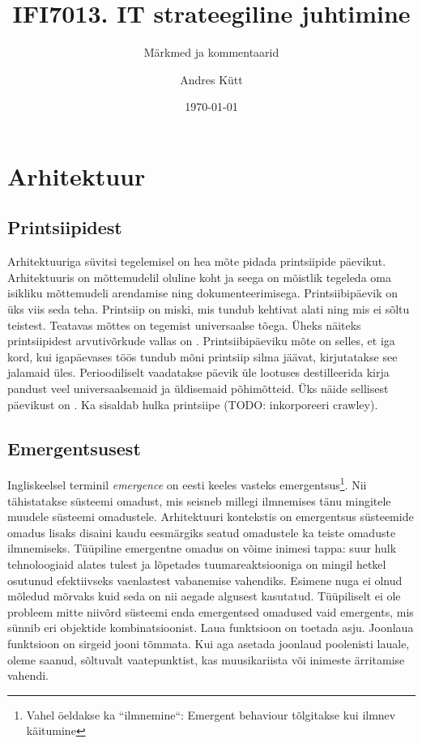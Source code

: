 \documentclass{article}
\title{IFI7013. IT strateegiline juhtimine}
\subtitle{Märkmed ja kommentaarid}
\date{\today}
\author{Andres Kütt}
\begin{document}
\maketitle
\clearpage
\setcounter{tocdepth}{2}
\tableofcontents
\clearpage


\section{Arhitektuur}
\subsection{Printsiipidest}
Arhitektuuriga süvitsi tegelemisel on hea mõte pidada printsiipide päevikut. Arhitektuuris on mõttemudelil oluline koht ja seega on mõistlik tegeleda oma isikliku mõttemudeli arendamise ning dokumenteerimisega. Printsiibipäevik on üks viis seda teha. Printsiip on miski, mis tundub kehtivat alati ning mis ei sõltu teistest. Teatavas mõttes on tegemist universaalse tõega. Üheks näiteks printsiipidest arvutivõrkude vallas on \cite{callon1996rfc}. Printsiibipäeviku mõte on selles, et iga kord, kui igapäevases töös tundub mõni printsiip silma jäävat, kirjutatakse see jalamaid üles. Perioodiliselt vaadatakse päevik üle lootuses destilleerida kirja pandust veel universaalsemaid ja üldisemaid põhimõtteid. Üks näide sellisest päevikust on \cite{archprinciples}. Ka \cite{crawley2015systems} sisaldab hulka printsiipe (TODO: inkorporeeri crawley).

\subsection{Emergentsusest}
Ingliskeelsel terminil \emph{emergence} on eesti keeles vasteks emergentsus\footnote{Vahel öeldakse ka ``ilmnemine``: Emergent behaviour tõlgitakse kui ilmnev käitumine}. Nii tähistatakse süsteemi omadust, mis seisneb millegi ilmnemises tänu mingitele muudele süsteemi omadustele. Arhitektuuri kontekstis on emergentsus süsteemide omadus lisaks disaini kaudu eesmärgiks seatud omadustele ka teiste omaduste ilmnemiseks. Tüüpiline emergentne omadus on võime inimesi tappa: suur hulk tehnoloogiaid alates tulest ja lõpetades tuumareaktsiooniga on mingil hetkel osutunud efektiivseks vaenlastest vabanemise vahendiks. Esimene nuga ei olnud mõledud mõrvaks kuid seda on nii aegade algusest kasutatud. Tüüpiliselt ei ole probleem mitte niivõrd süsteemi enda emergentsed omadused vaid emergents, mis sünnib eri objektide kombinatsioonist. Laua funktsioon on toetada asju. Joonlaua funktsioon on sirgeid jooni tõmmata. Kui aga asetada joonlaud poolenisti lauale, oleme saanud, sõltuvalt vaatepunktist, kas muusikariista või inimeste ärritamise vahendi. 
\end{document}
